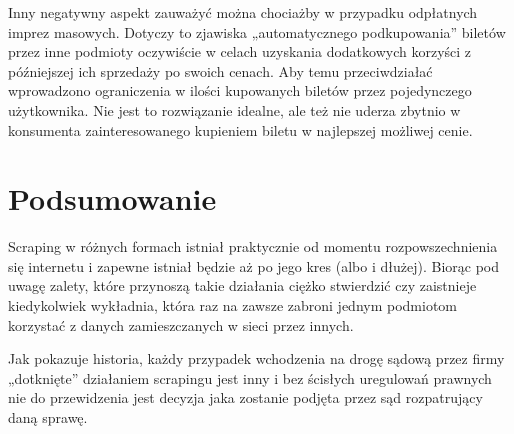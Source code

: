 Inny negatywny aspekt zauważyć można chociażby w przypadku odpłatnych imprez masowych. Dotyczy to zjawiska „automatycznego podkupowania” biletów przez inne podmioty oczywiście w celach uzyskania dodatkowych korzyści z późniejszej ich sprzedaży po swoich cenach. Aby temu przeciwdziałać wprowadzono ograniczenia w ilości kupowanych biletów przez pojedynczego użytkownika. Nie jest to rozwiązanie idealne, ale też nie uderza zbytnio w konsumenta zainteresowanego kupieniem biletu w najlepszej możliwej cenie. 

\section{Podsumowanie}

Scraping w różnych formach istniał praktycznie od momentu rozpowszechnienia się internetu i zapewne istniał będzie aż po jego kres (albo i dłużej). Biorąc pod uwagę zalety, które przynoszą takie działania ciężko stwierdzić czy zaistnieje kiedykolwiek wykładnia, która raz na zawsze zabroni jednym podmiotom korzystać z danych zamieszczanych w sieci przez innych. 

Jak pokazuje historia, każdy przypadek wchodzenia na drogę sądową przez firmy „dotknięte” działaniem scrapingu jest inny i bez ścisłych uregulowań prawnych nie do przewidzenia jest decyzja jaka zostanie podjęta przez sąd rozpatrujący daną sprawę. 